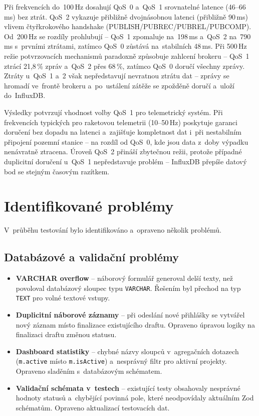 Při frekvencích do~100\,Hz dosahují QoS~0 a~QoS~1 srovnatelné latence (46--66\,ms) bez ztrát. QoS~2 vykazuje přibližně dvojnásobnou latenci (přibližně 90\,ms) vlivem čtyřkrokového handshake (PUBLISH/PUBREC/PUBREL/PUBCOMP). Od~200\,Hz se rozdíly prohlubují -- QoS~1 zpomaluje na~198\,ms a~QoS~2 na~790\,ms s~prvními ztrátami, zatímco QoS~0 zůstává na~stabilních 48\,ms. Při 500\,Hz režie potvrzovacích mechanismů paradoxně způsobuje zahlcení brokeru -- QoS~1 ztrácí 21,8\,\% zpráv a~QoS~2 přes 68\,\%, zatímco QoS~0 doručí všechny zprávy. Ztráty u~QoS~1 a~2 však nepředstavují nevratnou ztrátu dat -- zprávy se hromadí ve~frontě brokeru a~po~ustálení zátěže se zpožděně doručí a~uloží do~InfluxDB.

Výsledky potvrzují vhodnost volby QoS~1 pro telemetrický systém. Při frekvencích typických pro raketovou telemetrii (10--50\,Hz) poskytuje garanci doručení bez dopadu na latenci a~zajišťuje kompletnost dat i~při nestabilním připojení pozemní stanice -- na rozdíl od QoS~0, kde jsou data z~doby výpadku nenávratně ztracena. Úroveň QoS~2 přináší zbytečnou režii, protože případné duplicitní doručení u~QoS~1 nepředstavuje problém -- InfluxDB přepíše datový bod se stejným časovým razítkem.

\section{Identifikované problémy}

V~průběhu testování bylo identifikováno a~opraveno několik problémů.

\subsection{Databázové a validační problémy}

\begin{itemize}
    \item \textbf{VARCHAR overflow} -- náborový formulář generoval delší texty, než povoloval databázový sloupec typu \texttt{VARCHAR}. Řešením byl přechod na typ \texttt{TEXT} pro volné textové vstupy.
    \item \textbf{Duplicitní náborové záznamy} -- při odeslání nové přihlášky se vytvářel nový záznam místo finalizace existujícího draftu. Opraveno úpravou logiky na finalizaci draftu změnou statusu.
    \item \textbf{Dashboard statistiky} -- chybné názvy sloupců v~agregačních dotazech (\texttt{m.active} místo \texttt{m.is\-Active}) a~nesprávný filtr pro aktivní projekty. Opraveno sladěním s~databázovým schématem.
    \item \textbf{Validační schémata v~testech} -- existující testy obsahovaly nesprávné hodnoty statusů a~chybějící povinná pole, které neodpovídaly aktuálním Zod schématům. Opraveno aktualizací testovacích dat.
\end{itemize}

